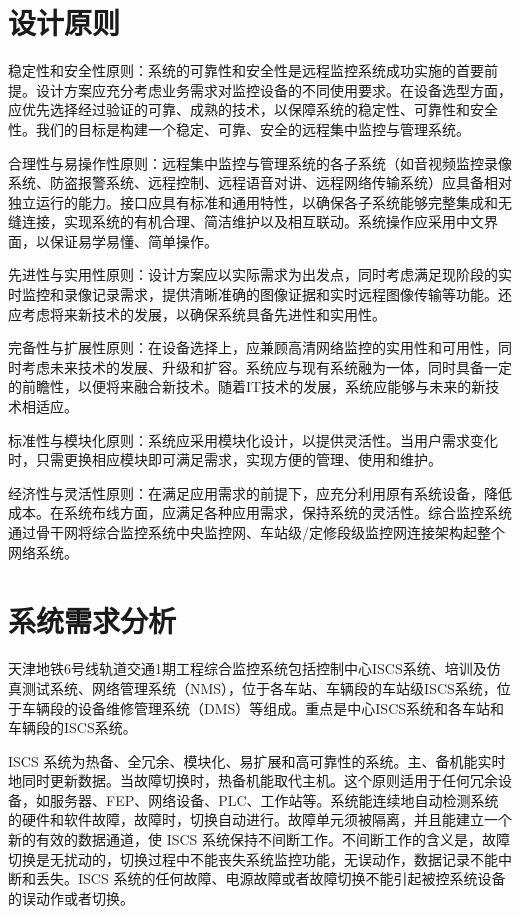 \section{设计原则}

稳定性和安全性原则：系统的可靠性和安全性是远程监控系统成功实施的首要前提。设计方案应充分考虑业务需求对监控设备的不同使用要求。在设备选型方面，应优先选择经过验证的可靠、成熟的技术，以保障系统的稳定性、可靠性和安全性。我们的目标是构建一个稳定、可靠、安全的远程集中监控与管理系统。

合理性与易操作性原则：远程集中监控与管理系统的各子系统（如音视频监控录像系统、防盗报警系统、远程控制、远程语音对讲、远程网络传输系统）应具备相对独立运行的能力。接口应具有标准和通用特性，以确保各子系统能够完整集成和无缝连接，实现系统的有机合理、简洁维护以及相互联动。系统操作应采用中文界面，以保证易学易懂、简单操作。

先进性与实用性原则：设计方案应以实际需求为出发点，同时考虑满足现阶段的实时监控和录像记录需求，提供清晰准确的图像证据和实时远程图像传输等功能。还应考虑将来新技术的发展，以确保系统具备先进性和实用性。

完备性与扩展性原则：在设备选择上，应兼顾高清网络监控的实用性和可用性，同时考虑未来技术的发展、升级和扩容。系统应与现有系统融为一体，同时具备一定的前瞻性，以便将来融合新技术。随着IT技术的发展，系统应能够与未来的新技术相适应。

标准性与模块化原则：系统应采用模块化设计，以提供灵活性。当用户需求变化时，只需更换相应模块即可满足需求，实现方便的管理、使用和维护。

经济性与灵活性原则：在满足应用需求的前提下，应充分利用原有系统设备，降低成本。在系统布线方面，应满足各种应用需求，保持系统的灵活性。综合监控系统通过骨干网将综合监控系统中央监控网、车站级/定修段级监控网连接架构起整个网络系统。

\section{系统需求分析}
天津地铁6号线轨道交通1期工程综合监控系统包括控制中心ISCS系统、培训及仿真测试系统、网络管理系统（NMS），位于各车站、车辆段的车站级ISCS系统，位于车辆段的设备维修管理系统（DMS）等组成。重点是中心ISCS系统和各车站和车辆段的ISCS系统。

ISCS 系统为热备、全冗余、模块化、易扩展和高可靠性的系统。主、备机能实时地同时更新数据。当故障切换时，热备机能取代主机。这个原则适用于任何冗余设备，如服务器、FEP、网络设备、PLC、工作站等。系统能连续地自动检测系统的硬件和软件故障，故障时，切换自动进行。故障单元须被隔离，并且能建立一个新的有效的数据通道，使 ISCS 系统保持不间断工作。不间断工作的含义是，故障切换是无扰动的，切换过程中不能丧失系统监控功能，无误动作，数据记录不能中断和丢失。ISCS 系统的任何故障、电源故障或者故障切换不能引起被控系统设备的误动作或者切换。

